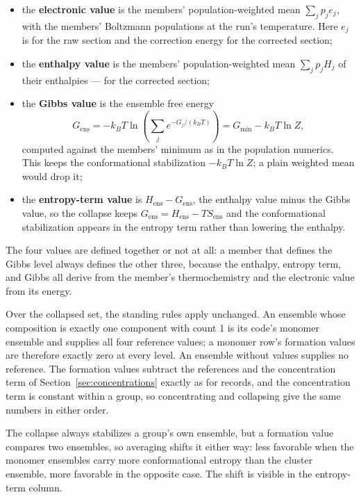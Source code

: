 \begin{itemize}
  \item the \textbf{electronic value} is the members' population-weighted
        mean $\sum_j p_j e_j$, with the members' Boltzmann populations at the
        run's temperature. Here $e_j$ is  for the raw
        section and the correction energy for the corrected section;
  \item the \textbf{enthalpy value} is the members' population-weighted mean
        $\sum_j p_j H_j$ of their enthalpies —  for the
        corrected section;
  \item the \textbf{Gibbs value} is the ensemble free energy
        \begin{equation}
        G_{\mathrm{ens}} = -k_B T \ln\!\left(\sum_j e^{-G_j/(k_B T)}\right)
        = G_{\min} - k_B T \ln Z,
        \end{equation}
        computed against the members' minimum as in the population
        numerics. This keeps the conformational stabilization
        $-k_B T\ln Z$; a plain weighted mean would drop it;
  \item the \textbf{entropy-term value} is $H_{\mathrm{ens}} -
        G_{\mathrm{ens}}$, the enthalpy value minus the Gibbs value, so the
        collapse keeps $G_{\mathrm{ens}} = H_{\mathrm{ens}} - T
        S_{\mathrm{ens}}$ and the conformational stabilization appears in
        the entropy term rather than lowering the enthalpy.
\end{itemize}

The four values are defined together or not at all: a member that defines
the Gibbs level always defines the other three, because the enthalpy,
entropy term, and Gibbs all derive from the member's thermochemistry and
the electronic value from its energy.

Over the collapsed set, the standing rules apply unchanged. An ensemble whose
composition is exactly one component with count 1 is its code's monomer
ensemble and supplies all four reference values; a monomer row's formation
values are therefore exactly zero at every level. An ensemble without values
supplies no reference. The formation values subtract the references and the
concentration term of Section~\ref{sec:concentrations} exactly as for
records, and the concentration term is constant within a group, so
concentrating and collapsing give the same numbers in either order.

The collapse always stabilizes a group's own ensemble, but a formation value
compares two ensembles, so averaging shifts it either way: less favorable
when the monomer ensembles carry more conformational entropy than the
cluster ensemble, more favorable in the opposite case. The shift is visible
in the entropy-term column.

